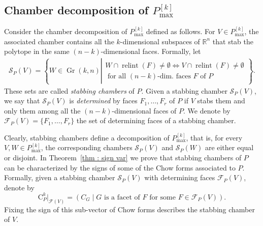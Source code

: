 \documentclass[english]{ourlematema}
\DeclareMathOperator{\Gr}{Gr}
\DeclareMathOperator{\relint}{relint}
\newcommand{\mF}{\mathcal{F}}
\newcommand{\mS}{\mathcal{S}}
\newcommand{\RR}{\mathbb{R}}
\newcommand{\Pkmax}{P^{[k]}_{\max}}
\newcommand{\CPk}{\mathrm{C}_P^k}
\begin{document}
\subsection{Chamber decomposition of $\Pkmax$}

Consider the chamber decomposition of $\Pkmax$ defined as follows. For $V\in \Pkmax$, the associated chamber contains all the $k$-dimensional subspaces of $\RR^n$ that stab the polytope in the same $(n-k)$-dimensional faces. Formally, let 
\begin{align*}
    \mS_P(V) = \left\{ W\in \Gr(k,n) \left| \begin{matrix}W\cap \relint(F) \neq \emptyset \iff V \cap \relint(F) \neq \emptyset \\\text{ for all } (n-k)\text{-dim. faces } F \text{ of } P\end{matrix}\right.\right\}.
\end{align*} 
These sets are called \emph{stabbing chambers} of $P$. Given a stabbing chamber $\mS_P(V)$, we say that $\mS_P(V)$ is \emph{determined} by faces $F_1,\ldots, F_r$ of $P$ if $V$ stabs them and only them among all the $(n-k)$-dimensional faces of $P$. We denote by $\mF_P(V) = \{F_1,\ldots,F_r\}$ the set of determining faces of a stabbing chamber.

Clearly, stabbing chambers define a decomposition of $\Pkmax$, that is, for every $V,W \in \Pkmax$, the corresponding chambers $\mS_P(V)$ and $\mS_P(W)$ are either equal or disjoint.
In Theorem~\ref{thm : sign var} we prove that stabbing chambers of $P$ can be characterized by the signs of some of the Chow forms associated to $P$. Formally, given a stabbing chamber $\mS_P(V)$ with determining faces $\mF_P(V)$, denote by 
\[ \CPk|_{\mF(V)} = (C_G \mid G \text{ is a facet of } F \text{ for some } F\in \mF_P(V)). \]
Fixing the sign of this sub-vector of Chow forms describes the stabbing chamber of $V$.
\end{document}
